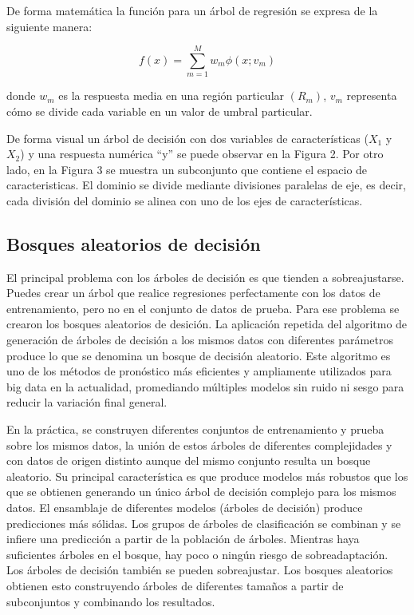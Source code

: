 \documentclass[conference]{IEEEtran}
\begin{document}
De forma matemática la función para un árbol de regresión se expresa de la siguiente manera: 

\begin{equation}
f(x)=\sum_{m=1}^{M} w_m\phi(x;v_m)
\end{equation}

donde $w_m$ es la respuesta media en una región particular $(R_m)$, $v_m$ representa cómo se divide cada variable en un valor de umbral particular.

De forma visual un árbol de decisión con dos variables de características ($X_1$ y $X_2$) y una respuesta numérica “y” se puede observar en la Figura 2. Por otro lado, en la Figura 3 se muestra un subconjunto que contiene el espacio de caracteristicas. El dominio se divide mediante divisiones paralelas de eje, es decir, cada división del dominio se alinea con uno de los ejes de características.

\subsection{Bosques aleatorios de decisión}
El principal problema con los árboles de decisión es que tienden a sobreajustarse. Puedes crear un árbol que realice regresiones perfectamente con los datos de entrenamiento, pero no en el conjunto de datos de prueba. Para ese problema se crearon los bosques aleatorios de desición. La aplicación repetida del algoritmo de generación de árboles de decisión a los mismos datos con diferentes parámetros produce lo que se denomina un bosque de decisión aleatorio. Este algoritmo es uno de los métodos de pronóstico más eficientes y ampliamente utilizados para big data en la actualidad, promediando múltiples modelos sin ruido ni sesgo para reducir la variación final general. 

En la práctica, se construyen diferentes conjuntos de entrenamiento y prueba sobre los mismos datos, la unión de estos árboles de diferentes complejidades y con datos de origen distinto aunque del mismo conjunto resulta un bosque aleatorio. Su principal característica es que produce modelos más robustos que los que se obtienen generando un único árbol de decisión complejo para los mismos datos. El ensamblaje de diferentes modelos (árboles de decisión) produce predicciones más sólidas. Los grupos de árboles de clasificación se combinan y se infiere una predicción a partir de la población de árboles. Mientras haya suficientes árboles en el bosque, hay poco o ningún riesgo de sobreadaptación. Los árboles de decisión también se pueden sobreajustar. Los bosques aleatorios obtienen esto construyendo árboles de diferentes tamaños a partir de subconjuntos y combinando los resultados.
\end{document}
